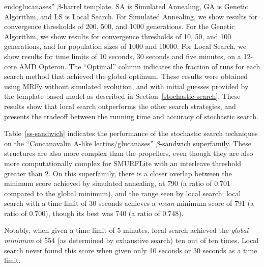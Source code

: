 \documentclass[blockstyle,times,preprint]{sigplanconf}
\begin{document}
\begin{small}
\begin{table}[htb]
{endoglucanases'' $\beta$-barrel template. 
SA is Simulated Annealing, GA is Genetic Algorithm, and LS is Local Search. 
For Simulated Annealing, we show results for convergence thresholds of
200, 500, and 1000 generations. 
For the Genetic Algorithm, we show results for convergence thresholds of 10, 
50, and 100 generations, and for population sizes of 1000 and 10000.
For Local Search, we show results for time limits of 10 seconds, 30 seconds and 
five minutes, on a 12-core AMD Opteron.
The ``Optimal'' column indicates the fraction of runs for each search method
that achieved the global optimum.
These results were obtained using MRFy without simulated evolution,
and with initial guesses provided by the template-based model as described in 
Section~\ref{stochastic-search}.
These results show that local search outperforms the other search strategies,
and presents the tradeoff between the running time and accuracy of stochastic 
search.}
\end{table}
\end{small}

Table~\ref{ss-sandwich} indicates the performance of the stochastic
search techniques on the ``Concanavalin A-like lectins/glucanases'' 
$\beta$-sandwich superfamily.
These structures are also more complex than the propellers, even though they 
are also more computationally complex for SMURFLite with an interleave 
threshold greater than 2. 
On this superfamily, there is a closer overlap between the minimum score 
achieved by simulated annealing, at 790 (a ratio of 0.701 compared to the 
global minimum), and the range seen by local search;
local search with a time limit of 30 seconds achieves a \emph{mean} minimum
score of 791 (a ratio of 0.700), though its best was 740 (a ratio of 0.748).

Notably, when given a time limit of 5 minutes, local search achieved the 
\emph{global minimum} of 554 (as determined by exhaustive search) ten out of 
ten times. Local search never found this score when given only 10 seconds or
30 seconds as a time limit.
\end{document}
